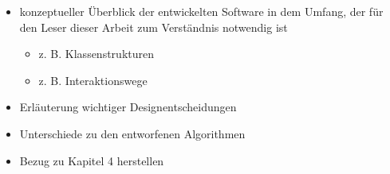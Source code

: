 \documentclass[../main/thesis.tex]{subfiles}
\begin{document}







\begin{itemize}
	\item konzeptueller Überblick der entwickelten Software in dem Umfang, der für den Leser dieser Arbeit zum Verständnis notwendig ist
	\begin{itemize}
		\item z. B. Klassenstrukturen
		\item z. B. Interaktionswege
	\end{itemize}
	\item Erläuterung wichtiger Designentscheidungen
	\item Unterschiede zu den entworfenen Algorithmen
	\item Bezug zu Kapitel 4 herstellen
\end{itemize}
\end{document}
